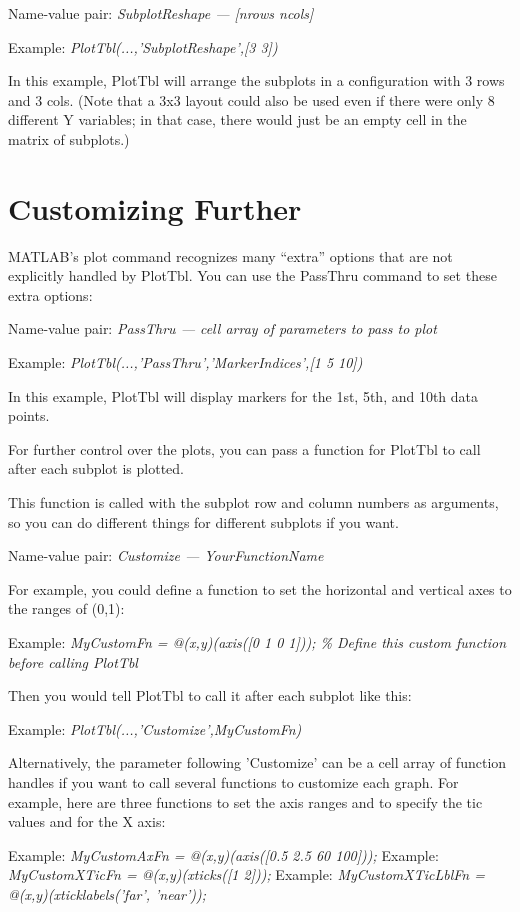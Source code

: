 \documentclass{article}
\newcommand{\example}[1]{Example: {\it #1}}
\newcommand{\namevalue}[2]{{\it #1 --- #2}}
\begin{document}
Name-value pair: \namevalue{SubplotReshape}{[nrows ncols]}

\example{PlotTbl(...,'SubplotReshape',[3 3])}

In this example, PlotTbl will arrange the subplots in a configuration with
3 rows and 3 cols.
(Note that a 3x3 layout could also be used even if there were only 8 different
Y variables; in that case, there would just be an empty cell in the matrix of
subplots.)

\section{Customizing Further}  %

MATLAB's plot command recognizes many ``extra'' options that are not explicitly handled by PlotTbl.
You can use the PassThru command to set these extra options:

Name-value pair: \namevalue{PassThru}{cell array of parameters to pass to plot}

\example{PlotTbl(...,'PassThru',{'MarkerIndices',[1 5 10]})}

In this example, PlotTbl will display markers for the 1st, 5th, and 10th data points.

For further control over the plots, you can pass a function for PlotTbl to
call after each subplot is plotted.

This function is called with the subplot row and column numbers as arguments,
so you can do different things for different subplots if you want.

Name-value pair: \namevalue{Customize}{YourFunctionName}

For example, you could define a function to set the horizontal and vertical
axes to the ranges of (0,1):

\example{MyCustomFn = @(x,y)(axis([0 1 0 1])); \% Define this custom function before calling PlotTbl}

Then you would tell PlotTbl to call it after each subplot like this:

\example{PlotTbl(...,'Customize',MyCustomFn)}

Alternatively, the parameter following 'Customize' can be a cell array of function handles
if you want to call several functions to customize each graph.
For example, here are three functions to set the axis ranges and to specify the tic values and for the X axis:

\example{MyCustomAxFn = @(x,y)(axis([0.5 2.5 60 100]));}
\example{MyCustomXTicFn = @(x,y)(xticks([1 2]));}
\example{MyCustomXTicLblFn = @(x,y)(xticklabels({'far', 'near'}));}
\end{document}
